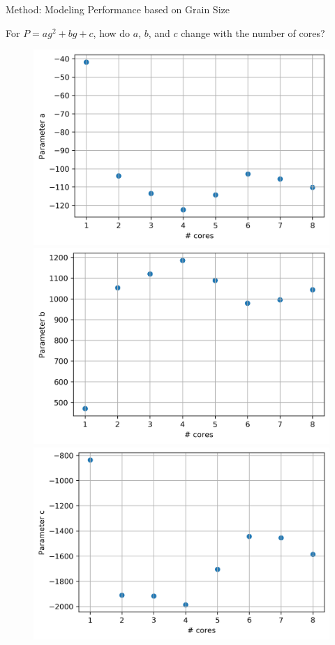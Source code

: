 \documentclass[10pt]{beamer}
\begin{document}
\begin{frame}{Method: Modeling Performance based on Grain Size}
	\begin{outline}	
		\1For $P=ag^2+bg+c$, how do $a$, $b$, and $c$ change with the number of cores?		\\
		\begin{figure}[H]
			\centering
			{\includegraphics[scale=.33]{images/polyfit/fig_1587_params_0before_fit.png}\label{fig31:a}}
			{\includegraphics[scale=.33]{images/polyfit/fig_1587_params_1before_fit.png}\label{fig31:b}}
			{\includegraphics[scale=.33]{images/polyfit/fig_1587_params_2before_fit.png}\label{fig31:c}}

\end{figure}
\end{outline}
\end{frame}
\end{document}

